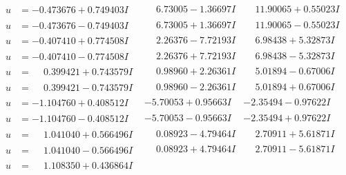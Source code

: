 \documentclass[1p]{elsarticle_modified}
\theoremstyle{definition}
\begin{document}
$$\begin{array}{c|c|c}
\begin{aligned}
u &= -0.473676 + 0.749403 I\end{aligned}
 & \phantom{-}6.73005 - 1.36697 I & \phantom{-}11.90065 + 0.55023 I \\ \hline\begin{aligned}
u &= -0.473676 - 0.749403 I\end{aligned}
 & \phantom{-}6.73005 + 1.36697 I & \phantom{-}11.90065 - 0.55023 I \\ \hline\begin{aligned}
u &= -0.407410 + 0.774508 I\end{aligned}
 & \phantom{-}2.26376 - 7.72193 I & \phantom{-}6.98438 + 5.32873 I \\ \hline\begin{aligned}
u &= -0.407410 - 0.774508 I\end{aligned}
 & \phantom{-}2.26376 + 7.72193 I & \phantom{-}6.98438 - 5.32873 I \\ \hline\begin{aligned}
u &= \phantom{-}0.399421 + 0.743579 I\end{aligned}
 & \phantom{-}0.98960 + 2.26361 I & \phantom{-}5.01894 - 0.67006 I \\ \hline\begin{aligned}
u &= \phantom{-}0.399421 - 0.743579 I\end{aligned}
 & \phantom{-}0.98960 - 2.26361 I & \phantom{-}5.01894 + 0.67006 I \\ \hline\begin{aligned}
u &= -1.104760 + 0.408512 I\end{aligned}
 & -5.70053 + 0.95663 I & -2.35494 - 0.97622 I \\ \hline\begin{aligned}
u &= -1.104760 - 0.408512 I\end{aligned}
 & -5.70053 - 0.95663 I & -2.35494 + 0.97622 I \\ \hline\begin{aligned}
u &= \phantom{-}1.041040 + 0.566496 I\end{aligned}
 & \phantom{-}0.08923 - 4.79464 I & \phantom{-}2.70911 + 5.61871 I \\ \hline\begin{aligned}
u &= \phantom{-}1.041040 - 0.566496 I\end{aligned}
 & \phantom{-}0.08923 + 4.79464 I & \phantom{-}2.70911 - 5.61871 I \\ \hline\begin{aligned}
u &= \phantom{-}1.108350 + 0.436864 I\end{aligned}

\end{array}$$
\end{document}
